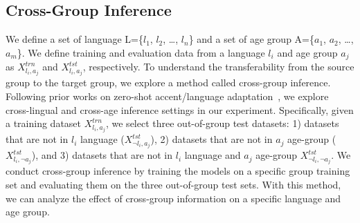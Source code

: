 \documentclass{INTERSPEECH2023}
\begin{document}

\subsection{Cross-Group Inference}
\label{sec:cross-group-inf}

We define a set of language L=\{$l_1$, $l_2$, \dots, $l_n$\} and a set of age group A=\{$a_1$, $a_2$, \dots, $a_m$\}. We define training and evaluation data from a language $l_i$ and age group $a_j$ as $X^{trn}_{l_i, a_j}$ and $X^{tst}_{l_i, a_j}$, respectively.
To understand the transferability from the source group to the target group, we explore a method called cross-group inference. Following prior works on zero-shot accent/language adaptation~\cite{winata2020crossaccent,hu2020xtreme,winata2022nusax}, we explore cross-lingual and cross-age inference settings in our experiment. Specifically, given a training dataset $X^{trn}_{l_i,a_j}$, we select three out-of-group test datasets: 1) datasets that are not in $l_i$ language ($X^{tst}_{\neg l_i,a_j}$), 2) datasets that are not in $a_j$ age-group ($X^{tst}_{l_i,\neg a_j}$), and 3) datasets that are not in $l_i$ language and $a_j$ age-group $X^{tst}_{\neg l_i, \neg a_j}$. We conduct cross-group inference by training the models on a specific group training set and evaluating them on the three out-of-group test sets. With this method, we can analyze the effect of cross-group information on a specific language and age group.
\end{document}
